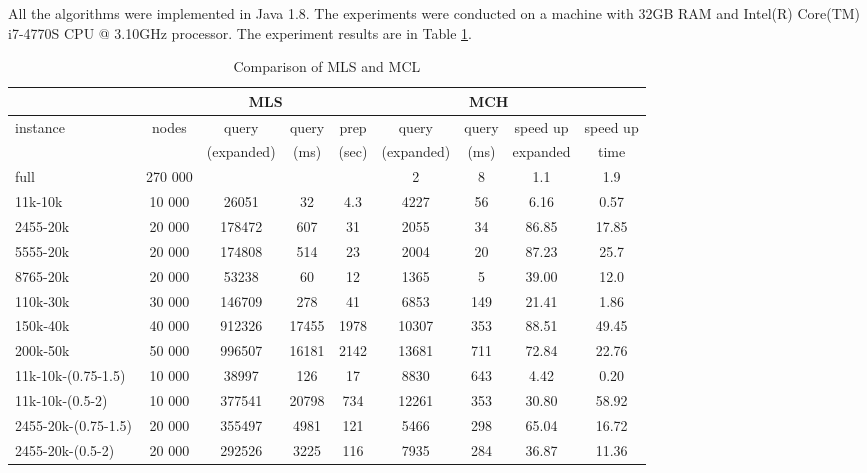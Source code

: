 
All the algorithms were implemented in Java 1.8. The experiments were conducted on a machine with 
32GB RAM and Intel(R) Core(TM) i7-4770S CPU @ 3.10GHz processor. The experiment results are in Table \ref{result}. 

\begin{table}[h]
\tiny
\caption{Comparison of MLS and MCL}
\label{result}
\begin{tabular}{l|c|cc|ccccc}
 & & \multicolumn{2}{c}{MLS} & \multicolumn{5}{c}{MCH} \\ \cline{3-6} \hline
instance & nodes & query & query & prep & query & query & speed up & speed up \\ \hline
& & (expanded) & (ms) & (sec) & (expanded) & (ms) & expanded & time \\ \hline
full & 270 000 & & & &  2 & 8 & 1.1 & 1.9 \\ \hline
11k-10k & 10 000 & 26051 & 32 & 4.3 & 4227 & 56 & 6.16 & 0.57 \\ \hline
2455-20k & 20 000 & 178472 & 607 & 31 & 2055 & 34 & 86.85 & 17.85 \\ \hline
5555-20k & 20 000 & 174808 & 514 & 23 & 2004 & 20 & 87.23 & 25.7 \\ \hline
8765-20k & 20 000 & 53238 & 60 & 12 & 1365 & 5 & 39.00 & 12.0 \\ \hline
110k-30k & 30 000 & 146709 & 278 & 41 & 6853 & 149 & 21.41 & 1.86 \\ \hline
150k-40k & 40 000 & 912326 & 17455 & 1978 & 10307 & 353 & 88.51& 49.45 \\ \hline
200k-50k & 50 000 & 996507 & 16181 & 2142 & 13681 & 711 & 72.84& 22.76 \\ \hline
11k-10k-(0.75-1.5) & 10 000  & 38997 & 126 & 17 & 8830 & 643 & 4.42 & 0.20 \\ \hline
11k-10k-(0.5-2) & 10 000     & 377541 & 20798 & 734 & 12261 & 353 & 30.80 & 58.92 \\ \hline
2455-20k-(0.75-1.5) & 20 000 & 355497 & 4981 & 121 & 5466 & 298 & 65.04 & 16.72 \\ \hline
2455-20k-(0.5-2) & 20 000    & 292526 & 3225 & 116 & 7935 & 284 & 36.87 & 11.36 \\ \hline

\end{tabular}
\end{table}

